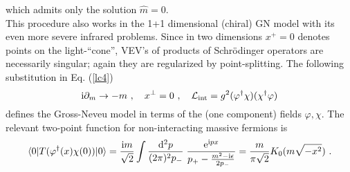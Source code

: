 \documentclass[a4paper,12pt]{article}
\begin{document}
which admits only the solution $\hat{m}=0$. \\
This  procedure also works in the 1+1 dimensional (chiral) GN model with its even more severe
infrared problems. Since in two dimensions $x^{+}=0$ denotes points on the light-``cone'', VEV's
of products of Schr\"odinger operators are necessarily singular;  again they are regularized by
point-splitting. The following substitution in Eq. (\ref{lc4})
\begin{displaymath}
  {\rm i}\partial_{m} \rightarrow -m \ , \quad x^{\perp} =0\ , \quad
 {\cal L}_{\rm int} = g^{2}(\varphi^{\dagger}\chi)(
  \chi^{\dagger}\varphi)
\end{displaymath}
defines the Gross-Neveu model in terms of the (one component) fields $\varphi,\chi$. The
relevant two-point function for non-interacting massive fermions is
$$ \langle 0|T(\varphi^{\dagger}(x)\chi(0))| 0 \rangle =\frac{{\rm i}m}{\sqrt{2}}
\int \frac{{\rm d}^{2}p}{(2 \pi)^{2}p_{-}} \; \frac{ {\rm e}^{{\rm i} p x}}{ p _{+}  -
\frac{m^{2} - {\rm i} \epsilon}{2 p_{-}}} = \frac{m}{\pi\sqrt{2}}K_{0}(m\sqrt{-x^{2}}) \ .     $$
\end{document}
